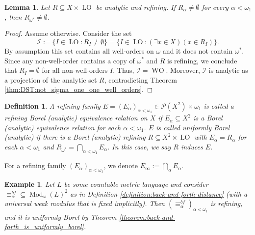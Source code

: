 \documentclass[12pt]{amsart}
\newtheorem{example}[theorem]{Example}
\newtheorem{lemma}[theorem]{Lemma}
\newtheorem{definition}[theorem]{Definition}
\DeclareMathOperator{\Mod}{Mod}
\DeclareMathOperator{\WO}{WO}
\DeclareMathOperator{\LO}{LO}
\begin{document}
\begin{lemma}\label{lemma:DST:Barwise_compactness}
    Let $R\subseteq X\times\LO$ be analytic and refining. If $R_{\alpha}\neq\emptyset$ for every $\alpha<\omega_1$, then $R_{\omega^*}\neq\emptyset$. 
\end{lemma}
\begin{proof}
    Assume otherwise. Consider the set
    \[ \mathcal{I}:=\{I\in\LO \colon R_I\neq\emptyset\}=\{ I \in \LO \colon (\exists x \in X)( x \in R_{I} ) \}. \]
    By assumption this set contains all well-orders on $\omega$ and it does not contain $\omega^*$. Since any non-well-order contains a copy of $\omega^*$ and $R$ is refining, we conclude that $R_I=\emptyset$ for all non-well-orders $I$. Thus, $\mathcal{I}=\WO$. Moreover, $\mathcal{I}$ is analytic as a projection of the analytic set $R$, contradicting Theorem \ref{thm:DST:not_sigma_one_one_well_orders}.
\end{proof}

\begin{definition}\label{definition:uniformly_borel_equivalence}
    A refining family $E=(E_\alpha)_{\alpha<\omega_1}\in\mathcal{P}( X^2)\times \omega_1$ is called a \textit{refining Borel (analytic) equivalence relation on $X$} if $E_\alpha\subseteq X^2$ is a Borel (analytic) equivalence relation for each $\alpha<\omega_1$. $E$ is called \textit{uniformly Borel (analytic)} if there is a Borel (analytic) refining ${R}\subseteq X^2\times \LO$ with $E_\alpha= R_\alpha$ for each $\alpha<\omega_1$ and $R_{\omega^*}= \bigcap_{\alpha<\omega_1} E_\alpha$. In this case, we say $R$ induces $E$.
\end{definition}

For a refining family $(E_\alpha)_{\alpha<\omega_1}$, we denote $E_\infty:=\bigcap_\alpha E_\alpha$. 

\begin{example}\label{example:bnf_uniformly_Borel}
    Let $L$ be some countable metric language and consider $\equiv_\alpha^{bf}\subseteq \Mod_\omega(L)^2$ as in Definition \ref{definition:back-and-forth-distance} (with a universal weak modulus that is fixed implicitly). Then $(\equiv_\alpha^{bf})_{\alpha<\omega_1}$ is refining, and it is uniformly Borel by Theorem \ref{theorem:back-and-forth_is_uniformly_borel}. 
\end{example}
\end{document}
